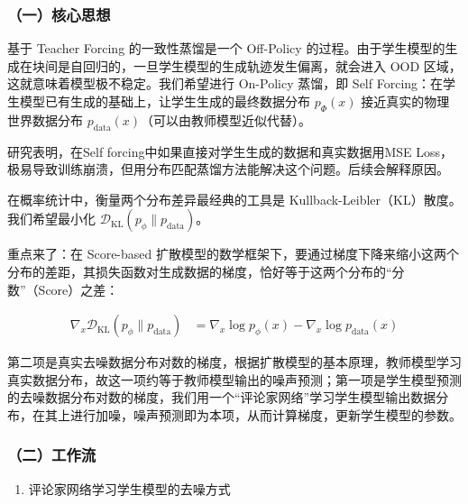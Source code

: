 \hypertarget{ux4e00ux6838ux5fc3ux601dux60f3-12}{%
\subsubsection{（一）核心思想}\label{ux4e00ux6838ux5fc3ux601dux60f3-12}}

基于 Teacher Forcing 的一致性蒸馏是一个 Off-Policy 的过程。由于学生模型的生成在块间是自回归的，一旦学生模型的生成轨迹发生偏离，就会进入 OOD 区域，这就意味着模型极不稳定。我们希望进行 On-Policy 蒸馏，即 Self Forcing：在学生模型已有生成的基础上，让学生生成的最终数据分布 \(p_\Phi(x)\) 接近真实的物理世界数据分布 \(p_{\mathrm{data}}(x)\)（可以由教师模型近似代替）。

研究表明，在Self forcing中如果直接对学生生成的数据和真实数据用MSE Loss，极易导致训练崩溃，但用分布匹配蒸馏方法能解决这个问题。后续会解释原因。

在概率统计中，衡量两个分布差异最经典的工具是 Kullback-Leibler（KL）散度。我们希望最小化 \(\mathcal{D}_{\mathrm{KL}}(p_\phi\|p_{\mathrm{data}})\)。

重点来了：在 Score-based 扩散模型的数学框架下，要通过梯度下降来缩小这两个分布的差距，其损失函数对生成数据的梯度，恰好等于这两个分布的``分数''（Score）之差：

\[
\begin{aligned}
\nabla_x\mathcal{D}_{\mathrm{KL}}(p_\phi\|p_{\mathrm{data}})
&=\nabla_x\log p_\phi(x)-\nabla_x\log p_{\mathrm{data}}(x)
\end{aligned}
\]

第二项是真实去噪数据分布对数的梯度，根据扩散模型的基本原理，教师模型学习真实数据分布，故这一项约等于教师模型输出的噪声预测；第一项是学生模型预测的去噪数据分布对数的梯度，我们用一个``评论家网络''学习学生模型输出数据分布，在其上进行加噪，噪声预测即为本项，从而计算梯度，更新学生模型的参数。

\hypertarget{ux4e8cux5de5ux4f5cux6d41-3}{%
\subsubsection{（二）工作流}\label{ux4e8cux5de5ux4f5cux6d41-3}}

\begin{enumerate}
\def\labelenumi{\arabic{enumi}.}
\tightlist
\item
  评论家网络学习学生模型的去噪方式
\end{enumerate}

